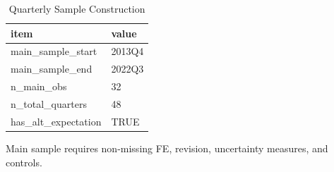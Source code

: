 \begin{table}[!htbp]
\centering
\caption{Quarterly Sample Construction}
\label{tab:sample_overview}
\begin{threeparttable}

\begin{tabular}{ll}
\toprule
item & value\\
\midrule
main\_sample\_start & 2013Q4\\
main\_sample\_end & 2022Q3\\
n\_main\_obs & 32\\
n\_total\_quarters & 48\\
has\_alt\_expectation & TRUE\\
\bottomrule
\end{tabular}
\begin{tablenotes}[flushleft]
\footnotesize
\item Main sample requires non-missing FE, revision, uncertainty measures, and controls.
\end{tablenotes}
\end{threeparttable}
\end{table}
